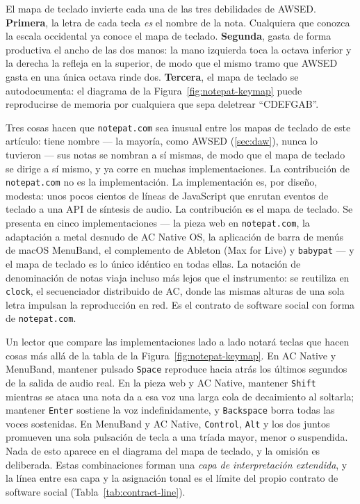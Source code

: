 \documentclass[10pt,letterpaper,twocolumn]{article}
\begin{document}
El mapa de teclado invierte cada una de las tres debilidades de AWSED. \textbf{Primera}, la letra de cada tecla \emph{es} el nombre de la nota. Cualquiera que conozca la escala occidental ya conoce el mapa de teclado. \textbf{Segunda}, gasta de forma productiva el ancho de las dos manos: la mano izquierda toca la octava inferior y la derecha la refleja en la superior, de modo que el mismo tramo que AWSED gasta en una única octava rinde dos. \textbf{Tercera}, el mapa de teclado se autodocumenta: el diagrama de la Figura~\ref{fig:notepat-keymap} puede reproducirse de memoria por cualquiera que sepa deletrear ``CDEFGAB''.

Tres cosas hacen que \texttt{notepat.com} sea inusual entre los mapas de teclado de este artículo: tiene nombre --- la mayoría, como AWSED (\textsection\ref{sec:daw}), nunca lo tuvieron --- sus notas se nombran a sí mismas, de modo que el mapa de teclado se dirige a sí mismo, y ya corre en muchas implementaciones. La contribución de \texttt{notepat.com} no es la implementación. La implementación es, por diseño, modesta: unos pocos cientos de líneas de JavaScript que enrutan eventos de teclado a una API de síntesis de audio. La contribución es el mapa de teclado. Se presenta en cinco implementaciones --- la pieza web en \texttt{notepat.com}, la adaptación a metal desnudo de AC Native OS, la aplicación de barra de menús de macOS MenuBand, el complemento de Ableton (Max for Live) y \texttt{babypat} --- y el mapa de teclado es lo único idéntico en todas ellas. La notación de denominación de notas viaja incluso más lejos que el instrumento: se reutiliza en \texttt{clock}, el secuenciador distribuido de AC, donde las mismas alturas de una sola letra impulsan la reproducción en red. Es el contrato de software social con forma de \texttt{notepat.com}.

Un lector que compare las implementaciones lado a lado notará teclas que hacen cosas más allá de la tabla de la Figura~\ref{fig:notepat-keymap}. En AC Native y MenuBand, mantener pulsado \texttt{Space} reproduce hacia atrás los últimos segundos de la salida de audio real. En la pieza web y AC Native, mantener \texttt{Shift} mientras se ataca una nota da a esa voz una larga cola de decaimiento al soltarla; mantener \texttt{Enter} sostiene la voz indefinidamente, y \texttt{Backspace} borra todas las voces sostenidas. En MenuBand y AC Native, \texttt{Control}, \texttt{Alt} y los dos juntos promueven una sola pulsación de tecla a una tríada mayor, menor o suspendida. Nada de esto aparece en el diagrama del mapa de teclado, y la omisión es deliberada. Estas combinaciones forman una \emph{capa de interpretación extendida}, y la línea entre esa capa y la asignación tonal es el límite del propio contrato de software social (Tabla~\ref{tab:contract-line}).
\end{document}
